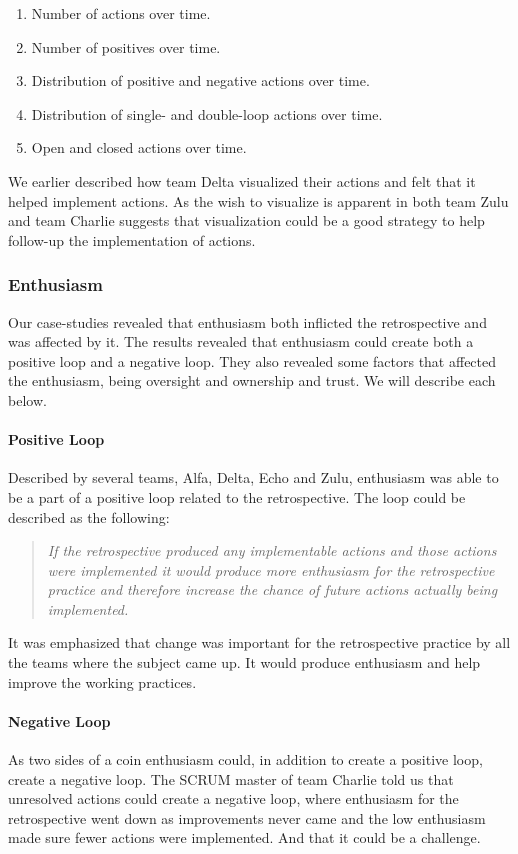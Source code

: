 \begin{enumerate}
\label{list:dashboard-data}
\item Number of actions over time.
\item Number of positives over time.
\item Distribution of positive and negative actions over time.
\item Distribution of single- and double-loop actions over time.
\item Open and closed actions over time.
\end{enumerate}

We earlier described how team Delta visualized their actions and felt that it helped implement actions. As the wish to visualize is apparent in both team Zulu and team Charlie suggests that visualization could be a good strategy to help follow-up the implementation of actions. 

\subsubsection{Enthusiasm}
Our case-studies revealed that enthusiasm both inflicted the retrospective and was affected by it. The results revealed that enthusiasm could create both a positive loop and a negative loop. They also revealed some factors that affected the enthusiasm, being oversight and ownership and trust. We will describe each below. 

\paragraph{Positive Loop}
Described by several teams, Alfa, Delta, Echo and Zulu, enthusiasm was able to be a part of a positive loop related to the retrospective. The loop could be described as the following:

\begin{quote}
\textit{If the retrospective produced any implementable actions and those actions were implemented it would produce more enthusiasm for the retrospective practice and therefore increase the chance of future actions actually being implemented.}
\end{quote}

It was emphasized that change was important for the retrospective practice by all the teams where the subject came up. It would produce enthusiasm and help improve the working practices. 

\paragraph{Negative Loop}
As two sides of a coin enthusiasm could, in addition to create a positive loop, create a negative loop. The SCRUM master of team Charlie told us that unresolved actions could create a negative loop, where enthusiasm for the retrospective went down as improvements never came and the low enthusiasm made sure fewer actions were implemented. And that it could be a challenge. 

